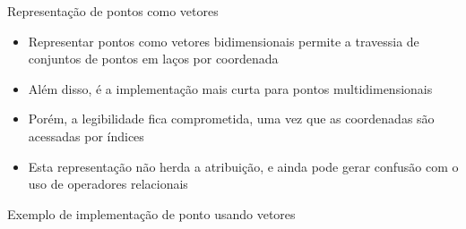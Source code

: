 \begin{frame}[fragile]{Representação de pontos como vetores}

    \begin{itemize}
        \item Representar pontos como vetores bidimensionais permite a travessia de conjuntos
            de pontos em laços por coordenada

        \item Além disso, é a implementação mais curta para pontos multidimensionais

        \item Porém, a legibilidade fica comprometida, uma vez que as coordenadas são acessadas
            por índices

        \item Esta representação não herda a atribuição, e ainda pode gerar 
            confusão com o uso de operadores relacionais
    \end{itemize}

\end{frame}

\begin{frame}[fragile]{Exemplo de implementação de ponto usando vetores}


\end{frame}
